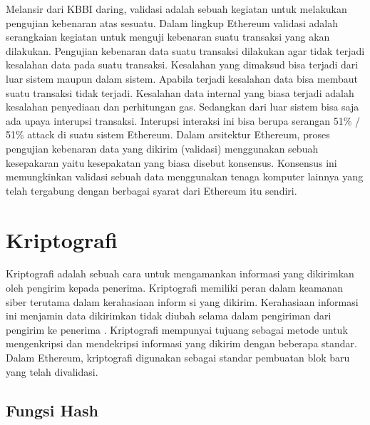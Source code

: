 Melansir dari KBBI daring, validasi adalah sebuah kegiatan untuk melakukan pengujian kebenaran atas sesuatu. Dalam lingkup Ethereum validasi adalah serangkaian kegiatan untuk menguji kebenaran suatu transaksi yang akan dilakukan. Pengujian kebenaran data suatu transaksi dilakukan agar tidak terjadi kesalahan data pada suatu transaksi. Kesalahan yang dimaksud bisa terjadi dari luar sistem maupun dalam sistem. Apabila terjadi kesalahan data bisa membaut suatu transaksi tidak terjadi. Kesalahan data internal yang biasa terjadi adalah kesalahan penyediaan dan perhitungan gas. Sedangkan dari luar sistem bisa saja ada upaya interupsi transaksi. Interupsi interaksi ini bisa berupa serangan 51\% / 51\% attack di suatu sistem Ethereum. Dalam arsitektur Ethereum, proses pengujian kebenaran data yang dikirim (validasi) menggunakan sebuah  kesepakaran yaitu kesepakatan yang biasa disebut konsensus. Konsensus ini memungkinkan validasi sebuah data menggunakan tenaga komputer lainnya yang telah tergabung dengan berbagai syarat dari Ethereum itu sendiri.

\section{Kriptografi}
\label{sec:kriptografi}

Kriptografi adalah sebuah cara untuk mengamankan informasi yang dikirimkan oleh pengirim kepada penerima. Kriptografi memiliki peran dalam keamanan siber terutama dalam kerahasiaan inform si yang dikirim. Kerahasiaan informasi ini menjamin data dikirimkan tidak diubah selama dalam pengiriman dari pengirim ke penerima \cite{stallings1999cryptography}. Kriptografi mempunyai tujuang sebagai metode untuk mengenkripsi dan mendekripsi informasi yang dikirim dengan beberapa standar. Dalam Ethereum, kriptografi digunakan sebagai standar pembuatan blok baru yang telah divalidasi.  

\subsection{Fungsi Hash}
\label{subsec:hashfunction}

